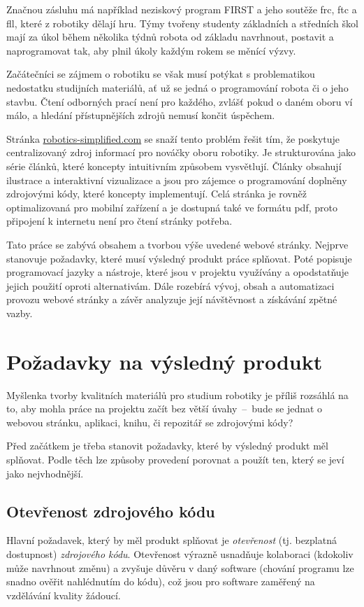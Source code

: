 \documentclass[a4paper, 12pt, twoside]{article}
\begin{document}
  Značnou zásluhu má například neziskový program FIRST a jeho soutěže \gls{frc}, \gls{ftc} a \gls{fll}, které z robotiky dělají hru. Týmy tvořeny studenty základních a středních škol mají za úkol během několika týdnů robota od základu navrhnout, postavit a naprogramovat tak, aby plnil úkoly každým rokem se měnící výzvy.

  Začátečníci se zájmem o robotiku se však musí potýkat s problematikou nedostatku studijních materiálů, ať už se jedná o programování robota či o jeho stavbu. Čtení odborných prací není pro každého, zvlášť pokud o daném oboru ví málo, a hledání přístupnějších zdrojů nemusí končit úspěchem.

  Stránka \url{robotics-simplified.com} se snaží tento problém řešit tím, že poskytuje centralizovaný zdroj informací pro nováčky oboru robotiky. Je strukturována jako série článků, které koncepty intuitivním způsobem vysvětlují. Články obsahují ilustrace a interaktivní vizualizace a jsou pro zájemce o programování doplněny zdrojovými kódy, které koncepty implementují. Celá stránka je rovněž optimalizovaná pro mobilní zařízení a je dostupná také ve formátu \gls{pdf}, proto připojení k internetu není pro čtení stránky potřeba.

  Tato práce se zabývá obsahem a tvorbou výše uvedené webové stránky. Nejprve stanovuje požadavky, které musí výsledný produkt práce splňovat. Poté popisuje programovací jazyky a nástroje, které jsou v projektu využívány a opodstatňuje jejich použití oproti alternativám. Dále rozebírá vývoj, obsah a automatizaci provozu webové stránky a závěr analyzuje její návštěvnost a získávání zpětné vazby.

  \newpage

  \section{Požadavky na výsledný produkt} \label{sec:Požadavky na výsledný produkt}
  Myšlenka tvorby kvalitních materiálů pro studium robotiky je příliš rozsáhlá na to, aby mohla práce na projektu začít bez větší úvahy~--~bude se jednat o webovou stránku, aplikaci, knihu, či repozitář se zdrojovými kódy?

  Před začátkem je třeba stanovit požadavky, které by výsledný produkt měl splňovat. Podle těch lze způsoby provedení porovnat a použít ten, který se jeví jako nejvhodnější.


  \subsection{Otevřenost zdrojového kódu}
  Hlavní požadavek, který by měl produkt splňovat je \emph{otevřenost} (tj. bezplatná dostupnost) \emph{zdrojového kódu}. Otevřenost výrazně usnadňuje kolaboraci (kdokoliv může navrhnout změnu) a zvyšuje důvěru v daný software (chování programu lze snadno ověřit nahlédnutím do kódu), což jsou pro software zaměřený na vzdělávání kvality žádoucí.
\end{document}
